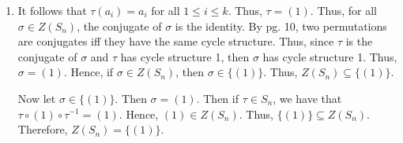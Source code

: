 \documentclass[12pt]{article}
\makeatletter
\theoremstyle{definition}
\theoremstyle{remark}
\renewenvironment{proof}[1][\proofname]{\par
  \pushQED{\qed}%
  \normalfont \topsep6\p@\@plus6\p@\relax
  \list{}{\leftmargin=0mm
          \rightmargin=4mm
          \settowidth{\itemindent}{\itshape#1}%
          \labelwidth=\itemindent
          \parsep=0pt \listparindent=\parindent 
  }
  \item[\hskip\labelsep
        \itshape
    #1\@addpunct{.}]\ignorespaces
}{%
  \popQED\endlist\@endpefalse
}
\let\oldproofname=\proofname
\renewcommand{\proofname}{\bf{\textit{\oldproofname}}}
\makeatother
\begin{document}
\begin{enumerate}[leftmargin=*]
\begin{proof}
            It follows that $\tau(a_i)=a_i$ for all $1\leq i\leq k$. Thus, $\tau=(1)$. Thus, for all $\sigma\in Z(S_n)$, the conjugate of $\sigma$ is the identity. By pg. 10, two permutations are conjugates iff they have the same cycle structure. Thus, since $\tau$ is the conjugate of $\sigma$ and $\tau$ has cycle structure 1, then $\sigma$ has cycle structure 1. Thus, $\sigma=(1)$. Hence, if $\sigma\in Z(S_n)$, then $\sigma\in\{(1)\}$. Thus, $Z(S_n)\subseteq\{(1)\}$.\par\hspace{4mm} Now let $\sigma\in\{(1)\}$. Then $\sigma=(1)$. Then if $\tau\in S_n$, we have that $\tau\circ(1)\circ\tau^{-1}=(1)$. Hence, $(1)\in Z(S_n)$. Thus, $\{(1)\}\subseteq Z(S_n)$. Therefore, $Z(S_n)=\{(1)\}$.
        \end{proof}
        

\end{enumerate}
\end{document}
